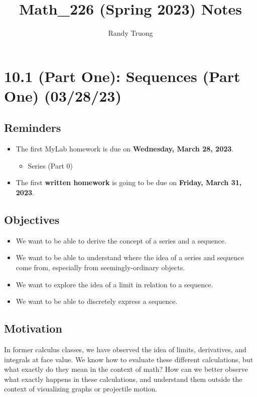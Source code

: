 \documentclass{report}
\title{Math\_226 (Spring 2023) Notes}
\date{}
\author{Randy Truong}
\begin{document}
\maketitle
\begin{sloppypar}
  \tableofcontents

\chapter{10.1 (Part One): Sequences (Part One) (03/28/23)}
\section{Reminders}
\begin{itemize}
  \item The first MyLab homework is due on
        \textbf{Wednesday, March 28, 2023}.
        \begin{itemize}
                \item Series (Part 0)
        \end{itemize}
  \item The first \textbf{written homework} is going to
        be due on \textbf{Friday, March 31, 2023}.

\end{itemize}

\section{Objectives}
\begin{itemize}
  \item We want to be able to derive the concept of a
        series and a sequence.
  \item We want to be able to understand
        where the idea of a series and sequence come from,
        especially from seemingly-ordinary objects.
  \item We want to explore the idea of a limit
        in relation to a sequence.
  \item We want to be able to discretely express
        a sequence.

\end{itemize}

\section{Motivation}
In former calculus classes, we have observed the idea of limits, derivatives, and integrals at face value. We
know how to evaluate these different calculations, but
what exactly do they mean in the context of math? How can
we better observe what exactly happens in these calculations,
and understand them outside the context of visualizing graphs
or projectile motion.

\end{sloppypar}
\end{document}

